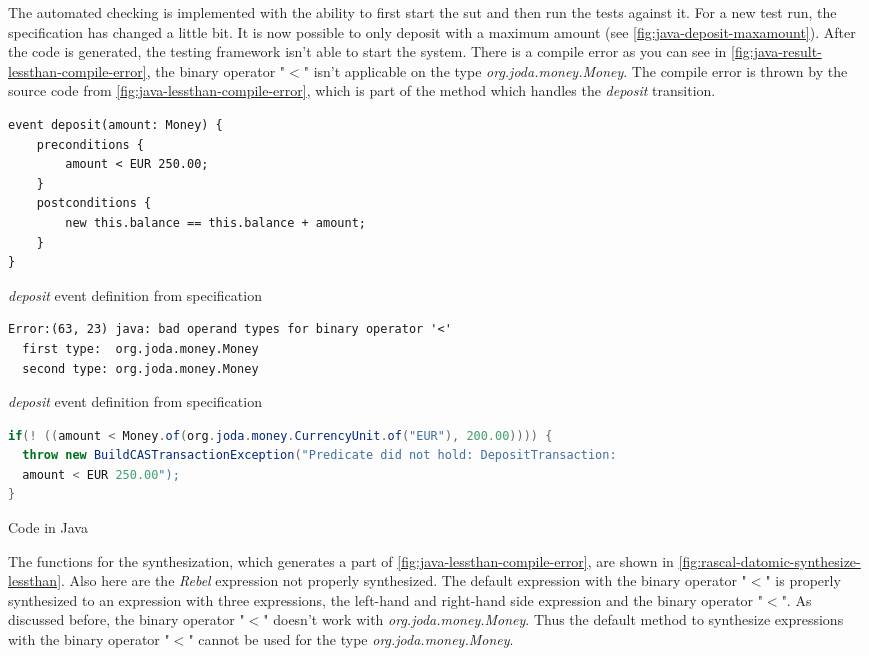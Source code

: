 The automated checking is implemented with the ability to first start the
\gls{sut} and then run the tests against it. For a new test run, the
specification has changed a little bit. It is now possible to only deposit with
a maximum amount (see \autoref{fig:java-deposit-maxamount}). After the code is
generated, the testing framework isn't able to start the system. There is a
compile error as you can see in
\autoref{fig:java-result-lessthan-compile-error}, the binary operator "$<$"
isn't applicable on the type \textit{org.joda.money.Money}. The compile error
is thrown by the source code from \autoref{fig:java-lessthan-compile-error},
which is part of the method which handles the \textit{deposit} transition.


\begin{sourcecode}[h!]
\begin{lstlisting}[]
event deposit(amount: Money) {
	preconditions {
		amount < EUR 250.00;
	}
	postconditions {
		new this.balance == this.balance + amount;
	}
}
\end{lstlisting}
\caption{\textit{deposit} event definition from specification}\label{fig:java-deposit-maxamount}
\end{sourcecode}
\FloatBarrier

\begin{sourcecode}[h!]
\begin{lstlisting}[]
Error:(63, 23) java: bad operand types for binary operator '<'
  first type:  org.joda.money.Money
  second type: org.joda.money.Money
\end{lstlisting}
\caption{\textit{deposit} event definition from specification}\label{fig:java-result-lessthan-compile-error}
\end{sourcecode}
\FloatBarrier

\begin{sourcecode}[h!]
\begin{lstlisting}[language=Java]
if(! ((amount < Money.of(org.joda.money.CurrencyUnit.of("EUR"), 200.00)))) {
  throw new BuildCASTransactionException("Predicate did not hold: DepositTransaction:
  amount < EUR 250.00");
}
\end{lstlisting}
\caption{Code in Java}\label{fig:java-lessthan-compile-error}
\end{sourcecode}
\FloatBarrier

The functions for the synthesization, which generates a part of
\autoref{fig:java-lessthan-compile-error}, are shown in
\autoref{fig:rascal-datomic-synthesize-lessthan}. Also here are the \textit{Rebel}
expression not properly synthesized. The default expression with the binary
operator "$<$" is properly synthesized to an expression with three expressions,
the left-hand and right-hand side expression and the binary operator "$<$".
As discussed before, the binary operator "$<$" doesn't work with
\textit{org.joda.money.Money}. Thus the default method to synthesize expressions
with the binary operator "$<$" cannot be used for the type
\textit{org.joda.money.Money}.

